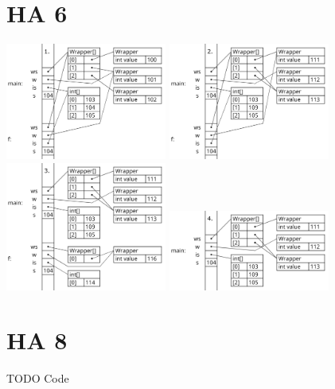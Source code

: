 \documentclass[a4paper]{article}
\begin{document}
\section*{ HA 6 }

	\includegraphics*[width=200px]{ProgramData_1.png} 
	\includegraphics*[width=200px]{ProgramData_2.png} 
	\includegraphics*[width=200px]{ProgramData_3.png} 
	\includegraphics*[width=200px]{ProgramData_4.png} 

\section*{ HA 8 }

TODO Code
\end{document}
